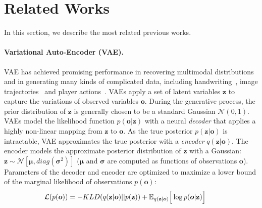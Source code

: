 \documentclass{article}
\newcommand{\expect}{\mathbb{E}}
\newcommand{\latentvariables}{\mathbf{z}}
\newcommand{\inference}{q}
\newcommand{\generation}{p}
\newcommand{\player}{pl}
\newcommand{\observation}{\boldsymbol{o}}
\begin{document}
\section{Related Works}
In this section, we describe the most related previous works.
\paragraph{Variational Auto-Encoder (VAE).} VAE has achieved promising performance in recovering multimodal distributions and in generating many kinds of complicated data, including handwriting~\cite{kingma2013auto}, image trajectories~\cite{WalkerDGH16} and player actions~\cite{mehrasa2019variational}.
VAEs apply a set of latent variables $\latentvariables$ to capture the variations of observed variables $\observation$.
During the generative process, the prior distribution of $\latentvariables$ is generally chosen to be a standard Gaussian $\mathcal{N}(0,1)$.
VAEs model the likelihood function $\generation(\observation|\latentvariables)$ with a neural {\it decoder} that applies a highly non-linear mapping from $\latentvariables$ to $\observation$.
As the true posterior $p(\latentvariables|\observation)$ is intractable, VAE approximates the true posterior with a {\it encoder}  $\inference(\latentvariables|\observation)$. The encoder models the approximate posterior distribution of $\latentvariables$ with a Gaussian: $\latentvariables\sim\mathcal{N}[\boldsymbol{\mu}, diag(\boldsymbol{\sigma}^{2})]$ ($\boldsymbol{\mu}$ and $\boldsymbol{\sigma}$ are computed as functions of observations $\observation$).
Parameters of the decoder and encoder are optimized to maximize a lower bound of the marginal likelihood of observations $p(\observation)$:
\vspace{-0.1in}
\begin{align}
     \hspace{-0.1in}\mathcal{L}(p(\observation))&=-KLD(\inference(\latentvariables|\observation)||p(\latentvariables))+\mathbb{E}_{\inference(\latentvariables|\observation)}\Big[\log\generation(\observation|\latentvariables)\Big]
\end{align}
\vspace{-0.15in}
\end{document}
